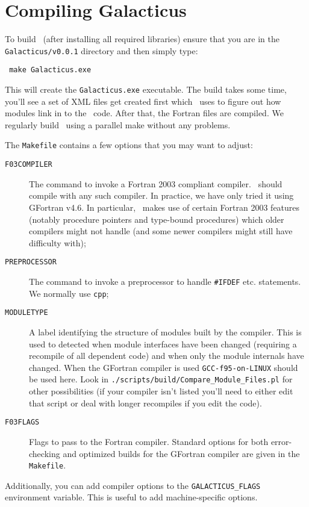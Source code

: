 \section{Compiling Galacticus}

To build \glc\ (after installing all required libraries) ensure that you are in the {\tt Galacticus/v0.0.1} directory and then simply type:
\begin{verbatim}
 make Galacticus.exe
\end{verbatim}
This will create the {\tt Galacticus.exe} executable. The build takes some time, you'll see a set of XML files get created first which \glc\ uses to figure out how modules link in to the \glc\ code. After that, the Fortran files are compiled. We regularly build \glc\ using a parallel make without any problems.

The {\tt Makefile} contains a few options that you may want to adjust:
\begin{description}
 \item[{\tt F03COMPILER}] The command to invoke a Fortran 2003 compliant compiler. \glc\ should compile with any such compiler. In practice, we have only tried it using {\sc GFortran} v4.6. In particular, \glc\ makes use of certain Fortran 2003 features (notably procedure pointers and type-bound procedures) which older compilers might not handle (and some newer compilers might still have difficulty with);
 \item[{\tt PREPROCESSOR}] The command to invoke a preprocessor to handle {\tt \#IFDEF} etc. statements. We normally use {\tt cpp};
 \item[{\tt MODULETYPE}] A label identifying the structure of modules built by the compiler. This is used to detected when module interfaces have been changed (requiring a recompile of all dependent code) and when only the module internals have changed. When the {\sc GFortran} compiler is used {\tt GCC-f95-on-LINUX} should be used here. Look in {\tt ./scripts/build/Compare\_Module\_Files.pl} for other possibilities (if your compiler isn't listed you'll need to either edit that script or deal with longer recompiles if you edit the code).
 \item[{\tt F03FLAGS}] Flags to pass to the Fortran compiler. Standard options for both error-checking and optimized builds for the {\sc GFortran} compiler are given in the {\tt Makefile}.
\end{description}
Additionally, you can add compiler options to the {\tt GALACTICUS\_FLAGS} environment variable. This is useful to add machine-specific options.

